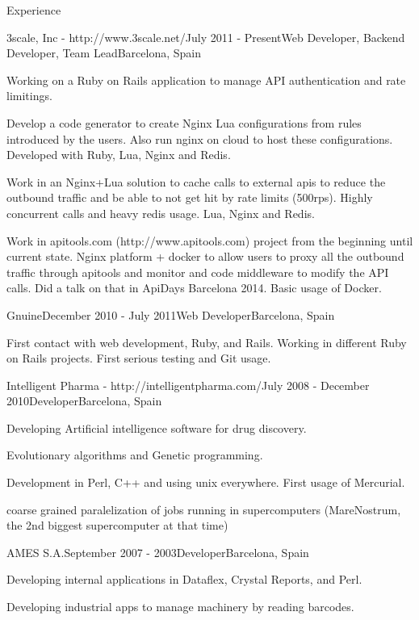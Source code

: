 \documentclass{resume} %
\begin{document}
\begin{rSection}{Experience}

\begin{rSubsection}{3scale, Inc - http://www.3scale.net/}{July 2011 - Present}{Web Developer, Backend Developer, Team Lead}{Barcelona, Spain}
\item Working on a Ruby on Rails application to manage API authentication and rate limitings.
\item Develop a code generator to create Nginx Lua configurations from
  rules introduced by the users. Also run nginx on cloud to host these
  configurations. Developed with Ruby, Lua, Nginx and Redis.
\item Work in an Nginx+Lua solution to cache calls to external apis to
  reduce the outbound traffic and be able to not get hit by rate
  limits (500rps). Highly concurrent calls and heavy redis usage. Lua, Nginx
  and Redis.
\item Work in apitools.com (http://www.apitools.com) project from the
  beginning until current state. Nginx platform + docker to allow
  users to proxy all the outbound traffic through apitools and monitor
  and code middleware to modify the API calls. Did a talk on that in
  ApiDays Barcelona 2014. Basic usage of Docker.
\end{rSubsection}


\begin{rSubsection}{Gnuine}{December 2010 - July 2011}{Web Developer}{Barcelona, Spain}
\item First contact with web development, Ruby, and Rails. Working in
  different Ruby on Rails projects. First serious testing and Git
  usage.
\end{rSubsection}


\begin{rSubsection}{Intelligent Pharma - http://intelligentpharma.com/}{July 2008 - December 2010}{Developer}{Barcelona, Spain}
\item Developing Artificial intelligence software for drug discovery.
\item Evolutionary algorithms and Genetic programming.
\item Development in Perl, C++ and using unix everywhere. First usage of Mercurial.
\item coarse grained paralelization of jobs running in supercomputers
  (MareNostrum, the 2nd biggest supercomputer at that time)
\end{rSubsection}


\begin{rSubsection}{AMES S.A.}{September 2007 - 2003}{Developer}{Barcelona, Spain}
\item Developing internal applications in Dataflex, Crystal Reports, and Perl.
\item Developing industrial apps to manage machinery by reading barcodes.
\end{rSubsection}

\end{rSection}
\end{document}
